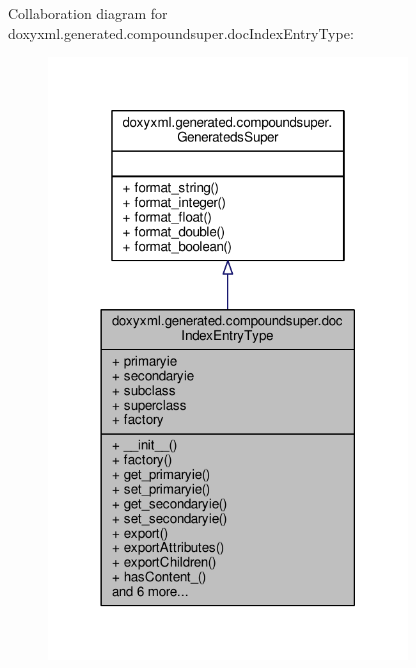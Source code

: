 Collaboration diagram for doxyxml.\+generated.\+compoundsuper.\+doc\+Index\+Entry\+Type\+:
\nopagebreak
\begin{figure}[H]
\begin{center}
\leavevmode
\includegraphics[width=270pt]{d7/d4f/classdoxyxml_1_1generated_1_1compoundsuper_1_1docIndexEntryType__coll__graph}
\end{center}
\end{figure}
